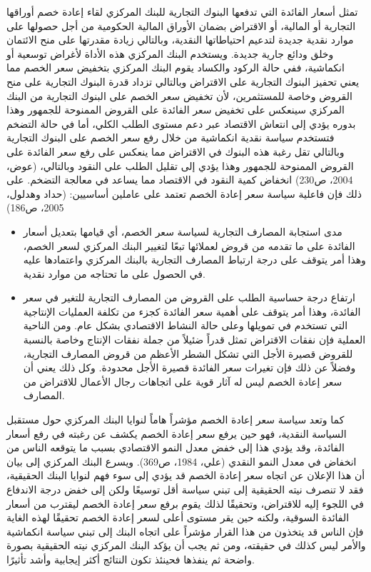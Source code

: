 \documentclass[10pt,a4paper]{report}
\begin{document}
\begin{doublespacing}
\begin{enumerate}
تمثل أسعار الفائدة التي تدفعها البنوك التجارية للبنك المركزي لقاء إعادة خصم أوراقها التجارية أو المالية، أو الاقتراض بضمان الأوراق المالية الحكومية من أجل حصولها على موارد نقدية جديدة لتدعيم احتياطاتها النقدية، وبالتالي زيادة مقدرتها على منح الائتمان وخلق ودائع جارية جديدة. ويستخدم البنك المركزي هذه الأداة لأغراض توسعية أو انكماشية، ففي حالة الركود والكساد يقوم البنك المركزي بتخفيض سعر الخصم مما يعني تحفيز البنوك التجارية على الاقتراض وبالتالي تزداد قدرة البنوك التجارية على منح القروض وخاصة للمستثمرين، لأن تخفيض سعر الخصم على البنوك التجارية من البنك المركزي سينعكس على تخفيض سعر الفائدة على القروض الممنوحة للجمهور وهذا بدوره يؤدي إلى انتعاش الاقتصاد عبر دعم مستوى الطلب الكلي، أما في حالة التضخم فتستخدم سياسة نقدية انكماشية من خلال رفع سعر الخصم على البنوك التجارية وبالتالي تقل رغبة هذه البنوك في الاقتراض مما ينعكس على رفع سعر الفائدة على القروض الممنوحة للجمهور وهذا يؤدي إلى تقليل الطلب على النقود وبالتالي، ({عوض، 2004، ص230}) انخفاض كمية النقود في الاقتصاد مما يساعد في معالجة التضخم. على ذلك فإن فاعلية سياسة سعر إعادة الخصم تعتمد على عاملين أساسيين: ({حداد وهدلول، 2005، ص186})
\begin{itemize}
	\item مدى استجابة المصارف التجارية لسياسة سعر الخصم، أي قيامها بتعديل أسعار الفائدة على ما تقدمه من قروض لعملائها تبعًا لتغيير البنك المركزي لسعر الخصم، وهذا أمر يتوقف على درجة ارتباط المصارف التجارية بالبنك المركزي واعتمادها عليه في الحصول على ما تحتاجه من موارد نقدية.
	\item ارتفاع درجة حساسية الطلب على القروض من المصارف التجارية للتغير في سعر الفائدة، وهذا أمر يتوقف على أهمية سعر الفائدة كجزء من تكلفة العمليات الإنتاجية التي تستخدم في تمويلها وعلى حالة النشاط الاقتصادي بشكل عام. ومن الناحية العملية فإن نفقات الاقتراض تمثل قدراً ضئيلاً من جملة نفقات الإنتاج وخاصة بالنسبة للقروض قصيرة الأجل التي تشكل الشطر الأعظم من قروض المصارف التجارية، وفضلاً عن ذلك فإن تغيرات سعر الفائدة قصيرة الأجل محدودة. وكل ذلك يعني أن سعر إعادة الخصم ليس له آثار قوية على اتجاهات رجال الأعمال للاقتراض من المصارف. 
\end{itemize}
كما وتعد سياسة سعر إعادة الخصم مؤشراً هاماً لنوايا البنك المركزي حول مستقبل السياسة النقدية، فهو حين يرفع سعر إعادة الخصم يكشف عن رغبته في رفع أسعار الفائدة، وقد يؤدي هذا إلى خفض معدل النمو الاقتصادي بسبب ما يتوقعه الناس من انخفاض في معدل النمو النقدي ({علي، 1984، ص369}). ويسرع البنك المركزي إلى بيان أن هذا الإعلان عن اتجاه سعر إعادة الخصم قد يؤدي إلى سوء فهم لنوايا البنك الحقيقية، فقد لا تنصرف نيته الحقيقية إلى تبني سياسة أقل توسيعًا ولكن إلى خفض درجة الاندفاع في اللجوء إليه للاقتراض، وتحقيقًا لذلك يقوم برفع سعر إعادة الخصم ليقترب من أسعار الفائدة السوقية، ولكنه حين يقر مستوى أعلى لسعر إعادة الخصم تحقيقًا لهذه الغاية فإن الناس قد يتخذون من هذا القرار مؤشراً على اتجاه البنك إلى تبني سياسة انكماشية والأمر ليس كذلك في حقيقته، ومن ثم يجب أن يؤكد البنك المركزي نيته الحقيقية بصورة واضحة ثم ينفذها فحينئذ تكون النتائج أكثر إيجابية وأشد تأثيرًا.
\end{enumerate}

\end{doublespacing}
\end{document}
